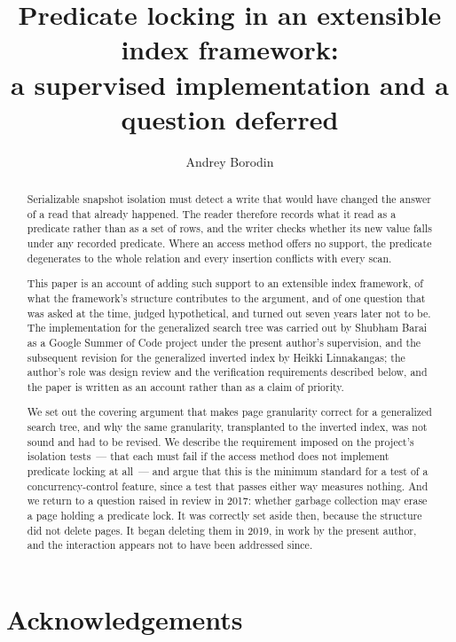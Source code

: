 \documentclass[11pt, a4paper]{article}
\title{Predicate locking in an extensible index framework:\\
a supervised implementation and a question deferred}
\author{Andrey Borodin}
\date{}
\begin{document}
\maketitle

\begin{abstract}
Serializable snapshot isolation must detect a write that would have changed the
answer of a read that already happened. The reader therefore records what it
read as a predicate rather than as a set of rows, and the writer checks whether
its new value falls under any recorded predicate. Where an access method offers
no support, the predicate degenerates to the whole relation and every insertion
conflicts with every scan.

This paper is an account of adding such support to an extensible index
framework, of what the framework's structure contributes to the argument, and of
one question that was asked at the time, judged hypothetical, and turned out
seven years later not to be. The implementation for the generalized search tree
was carried out by Shubham Barai as a Google Summer of Code project under the
present author's supervision, and the subsequent revision for the generalized
inverted index by Heikki Linnakangas; the author's role was design review and
the verification requirements described below, and the paper is written as an
account rather than as a claim of priority.

We set out the covering argument that makes page granularity correct for a
generalized search tree, and why the same granularity, transplanted to the
inverted index, was not sound and had to be revised. We describe the requirement
imposed on the project's isolation tests~--- that each must fail if the access
method does not implement predicate locking at all~--- and argue that this is the
minimum standard for a test of a concurrency-control feature, since a test that
passes either way measures nothing. And we return to a question raised in review
in 2017: whether garbage collection may erase a page holding a predicate lock.
It was correctly set aside then, because the structure did not delete pages. It
began deleting them in 2019, in work by the present author, and the interaction
appears not to have been addressed since.
\end{abstract}



\section*{Acknowledgements}
\end{document}

